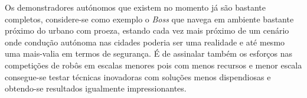 Os demonstradores autónomos que existem no momento já são bastante completos, considere-se
como exemplo o \emph{Boss} que navega em ambiente bastante próximo do urbano com proeza,
estando cada vez mais próximo de um cenário onde condução autónoma nas cidades poderia ser
uma realidade e até mesmo uma mais-valia em termos de segurança. É de assinalar também os esforços
nas competições de robôs em escalas menores pois com menos recursos e menor escala consegue-se
testar técnicas inovadoras com soluções menos dispendiosas e obtendo-se resultados igualmente
impressionantes.


